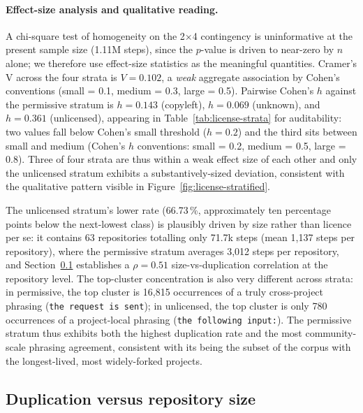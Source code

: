 \documentclass[11pt,a4paper]{article}
\begin{document}
\paragraph{Effect-size analysis and qualitative reading.} A
chi-square test of homogeneity on the 2$\times$4 contingency is
uninformative at the present sample size (1.11M steps), since the
$p$-value is driven to near-zero by $n$ alone; we therefore use
effect-size statistics as the meaningful quantities. Cramer's V
across the four strata is $V = 0.102$, a \emph{weak} aggregate
association by Cohen's conventions (small = 0.1, medium = 0.3,
large = 0.5). Pairwise Cohen's $h$ against the permissive stratum is
$h = 0.143$ (copyleft), $h = 0.069$ (unknown), and $h = 0.361$
(unlicensed), appearing in Table~\ref{tab:license-strata} for
auditability: two values fall below Cohen's small threshold ($h = 0.2$)
and the third sits between small and medium
(Cohen's $h$ conventions: small = 0.2, medium = 0.5, large = 0.8). Three of four
strata are thus within a weak effect size of each other and only
the unlicensed stratum exhibits a substantively-sized deviation,
consistent with the qualitative pattern visible in
Figure~\ref{fig:license-stratified}.

The unlicensed stratum's lower rate (66.73\,\%, approximately ten
percentage points below the next-lowest class) is plausibly driven by
size rather than licence per se: it contains 63 repositories totalling
only 71.7k steps (mean 1{,}137 steps per repository), where the
permissive stratum averages 3{,}012 steps per repository, and
Section~\ref{sec:evaluation:size} establishes a $\rho = 0.51$
size-vs-duplication correlation at the repository level. The
top-cluster concentration is also very different across strata: in
permissive, the top cluster is 16{,}815 occurrences of a truly
cross-project phrasing (\texttt{the request is sent}); in unlicensed,
the top cluster is only 780 occurrences of a project-local phrasing
(\texttt{the following input:}). The permissive stratum thus exhibits
both the highest duplication rate and the most community-scale
phrasing agreement, consistent with its being the subset of the
corpus with the longest-lived, most widely-forked projects.

\subsection{Duplication versus repository size}
\label{sec:evaluation:size}
\end{document}
